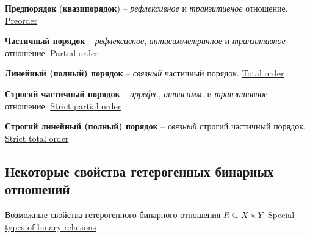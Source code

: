 \documentclass[a4paper,10pt]{article}
\begin{document}
\begin{terms}
    \item \textbf{Предпорядок} (\textbf{квазипорядок}) -- \emph{рефлексивное} и \emph{транзитивное} отношение.
    \hfill\href{https://en.wikipedia.org/wiki/Preorder}{Preorder}

    \item \textbf{Частичный порядок} -- \emph{рефлексивное}, \emph{антисимметричное} и \emph{транзитивное} отношение.
    \hfill\href{https://en.wikipedia.org/wiki/Partially_ordered_set}{Partial order}

    \item \textbf{Линейный (полный) порядок} -- \emph{связный} частичный порядок.
    \hfill\href{https://en.wikipedia.org/wiki/Total_order}{Total order}

    \item \textbf{Строгий частичный порядок} -- \emph{иррефл.}, \emph{антисимм.} и \emph{транзитивное} отношение.
    \hfill\href{https://en.wikipedia.org/wiki/Partially_ordered_set#Strict_partial_order}{Strict partial order}

    \item \textbf{Строгий линейный (полный) порядок} -- \emph{связный} строгий частичный порядок.
    \hfill\href{https://en.wikipedia.org/wiki/Total_order#Strict_total_order}{Strict total order}
\end{terms}



\subsection{Некоторые свойства гетерогенных бинарных отношений}

Возможные свойства гетерогенного бинарного отношения $R \subseteq X \times Y$:
\hfill\href{https://en.wikipedia.org/wiki/Binary_relation#Special_types_of_binary_relations}{Special types of binary relations}
\end{document}
